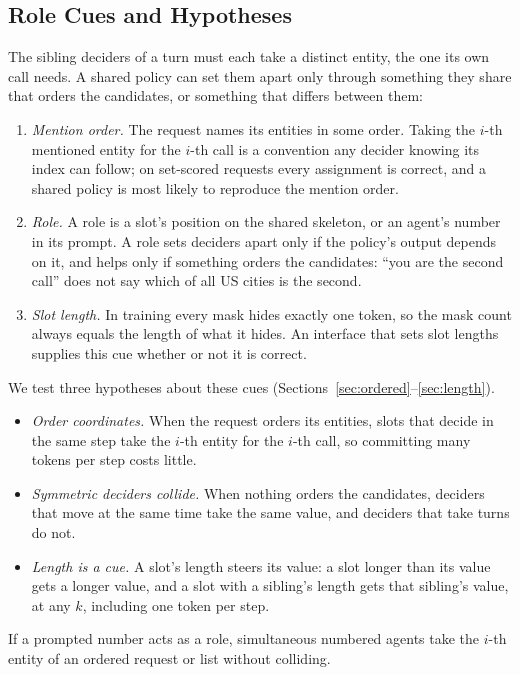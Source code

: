 \subsection{Role Cues and Hypotheses}
\label{sec:predictions}

The sibling deciders of a turn must each take a distinct entity, the one its own call needs. A shared policy can set them apart only through something they share that orders the candidates, or something that differs between them:
\begin{enumerate}
\item \emph{Mention order.} The request names its entities in some order. Taking the $i$-th mentioned entity for the $i$-th call is a convention any decider knowing its index can follow; on set-scored requests every assignment is correct, and a shared policy is most likely to reproduce the mention order.
\item \emph{Role.} A role is a slot's position on the shared skeleton, or an agent's number in its prompt. A role sets deciders apart only if the policy's output depends on it, and helps only if something orders the candidates: ``you are the second call'' does not say which of all US cities is the second.
\item \emph{Slot length.} In training every mask hides exactly one token, so the mask count always equals the length of what it hides. An interface that sets slot lengths supplies this cue whether or not it is correct.
\end{enumerate}

\noindent We test three hypotheses about these cues (Sections~\ref{sec:ordered}--\ref{sec:length}).
\begin{itemize}
\item[\pred{1}] \emph{Order coordinates.} When the request orders its entities, slots that decide in the same step take the $i$-th entity for the $i$-th call, so committing many tokens per step costs little.
\item[\pred{2}] \emph{Symmetric deciders collide.} When nothing orders the candidates, deciders that move at the same time take the same value, and deciders that take turns do not.
\item[\pred{3}] \emph{Length is a cue.} A slot's length steers its value: a slot longer than its value gets a longer value, and a slot with a sibling's length gets that sibling's value, at any $k$, including one token per step.
\end{itemize}
If a prompted number acts as a role, simultaneous numbered agents take the $i$-th entity of an ordered request or list without colliding.

